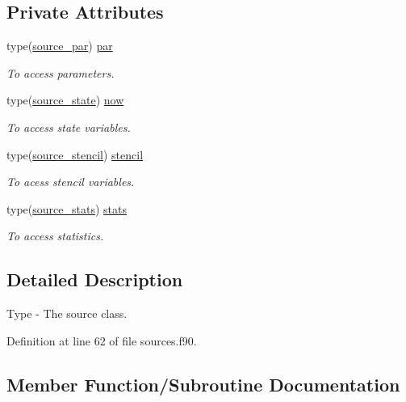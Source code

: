 \subsection*{Private Attributes}
\begin{DoxyCompactItemize}
\item 
type(\mbox{\hyperlink{structsources__mod_1_1source__par}{source\+\_\+par}}) \mbox{\hyperlink{structsources__mod_1_1source__class_a7dcca40df4b520fa207dbe93d7e49b2e}{par}}
\begin{DoxyCompactList}\small\item\em To access parameters. \end{DoxyCompactList}\item 
type(\mbox{\hyperlink{structsources__mod_1_1source__state}{source\+\_\+state}}) \mbox{\hyperlink{structsources__mod_1_1source__class_aa79ef3a745f7e6e934acdda367e8995c}{now}}
\begin{DoxyCompactList}\small\item\em To access state variables. \end{DoxyCompactList}\item 
type(\mbox{\hyperlink{structsources__mod_1_1source__stencil}{source\+\_\+stencil}}) \mbox{\hyperlink{structsources__mod_1_1source__class_a7950d4033c4b4be466479fc8a11dad1c}{stencil}}
\begin{DoxyCompactList}\small\item\em To acess stencil variables. \end{DoxyCompactList}\item 
type(\mbox{\hyperlink{structsources__mod_1_1source__stats}{source\+\_\+stats}}) \mbox{\hyperlink{structsources__mod_1_1source__class_a2ed110f187434e6b6345f21822993517}{stats}}
\begin{DoxyCompactList}\small\item\em To access statistics. \end{DoxyCompactList}\end{DoxyCompactItemize}


\subsection{Detailed Description}
Type -\/ The source class. 

Definition at line 62 of file sources.\+f90.



\subsection{Member Function/\+Subroutine Documentation}
\mbox{\label{structsources__mod_1_1source__class_a996650639d039c09d2b77a36473e977e}} 
